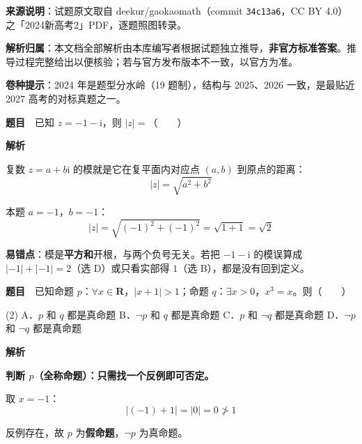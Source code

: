 

\begin{gknotice}
\textbf{来源说明}：试题原文取自 deekur/gaokaomath（commit \texttt{34c13a6}，CC BY 4.0）之「2024新高考2」PDF，逐题照图转录。

\textbf{解析归属}：本文档全部解析由本库编写者根据试题独立推导，\textbf{非官方标准答案}。推导过程完整给出以便核验；若与官方发布版本不一致，以官方为准。

\textbf{卷种提示}：2024 年是题型分水岭（19 题制），结构与 2025、2026 一致，是最贴近 2027 高考的对标真题之一。
\end{gknotice}

\par\medskip



\textbf{题目}　已知 $z=-1-\mathrm i$，则 $|z|=$（　　）

\textbf{解析}

复数 $z=a+b\mathrm i$ 的模就是它在复平面内对应点 $(a,b)$ 到原点的距离：
\[|z|=\sqrt{a^{2}+b^{2}}\]

本题 $a=-1$，$b=-1$：
\[|z|=\sqrt{(-1)^{2}+(-1)^{2}}=\sqrt{1+1}=\sqrt2\]


\begin{gktip}
\textbf{易错点}：模是\textbf{平方和}开根，与两个负号无关。若把 $-1-\mathrm i$ 的模误算成 $|-1|+|-1|=2$（选 D）或只看实部得 $1$（选 B），都是没有回到定义。
\end{gktip}

\par\medskip


\textbf{题目}　已知命题 $p$：$\forall x\in\mathbf R$，$|x+1|>1$；命题 $q$：$\exists x>0$，$x^{3}=x$。则（　　）

\begin{gkopts}(2)
\task A．$p$ 和 $q$ 都是真命题
\task B．$\neg p$ 和 $q$ 都是真命题
\task C．$p$ 和 $\neg q$ 都是真命题
\task D．$\neg p$ 和 $\neg q$ 都是真命题
\end{gkopts}

\textbf{解析}

\textbf{判断 $p$（全称命题）：只需找一个反例即可否定。}

取 $x=-1$：
\[|(-1)+1|=|0|=0\not>1\]

反例存在，故 $p$ 为\textbf{假命题}，$\neg p$ 为真命题。

